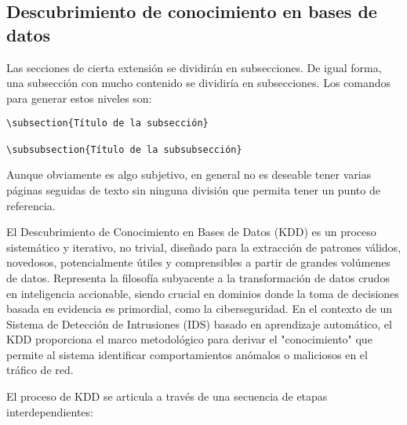 \subsection{Descubrimiento de conocimiento en bases de datos}


Las secciones de cierta extensión se dividirán en subsecciones. De igual forma, una subsección con mucho contenido se dividiría en subsecciones. Los comandos para generar estos niveles son:

\begin{verbatim}
\subsection{Título de la subsección}

\subsubsection{Título de la subsubsección}
\end{verbatim}

Aunque obviamente es algo subjetivo, en general no es deseable tener varias páginas seguidas de texto sin ninguna división que permita tener un punto de referencia.

El Descubrimiento de Conocimiento en Bases de Datos (KDD) es un proceso sistemático y iterativo, no trivial, diseñado para la extracción de patrones válidos, novedosos, potencialmente útiles y comprensibles a partir de grandes volúmenes de datos. Representa la filosofía subyacente a la transformación de datos crudos en inteligencia accionable, siendo crucial en dominios donde la toma de decisiones basada en evidencia es primordial, como la ciberseguridad. En el contexto de un Sistema de Detección de Intrusiones (IDS) basado en aprendizaje automático, el KDD proporciona el marco metodológico para derivar el "conocimiento" que permite al sistema identificar comportamientos anómalos o maliciosos en el tráfico de red.

El proceso de KDD se articula a través de una secuencia de etapas interdependientes:


